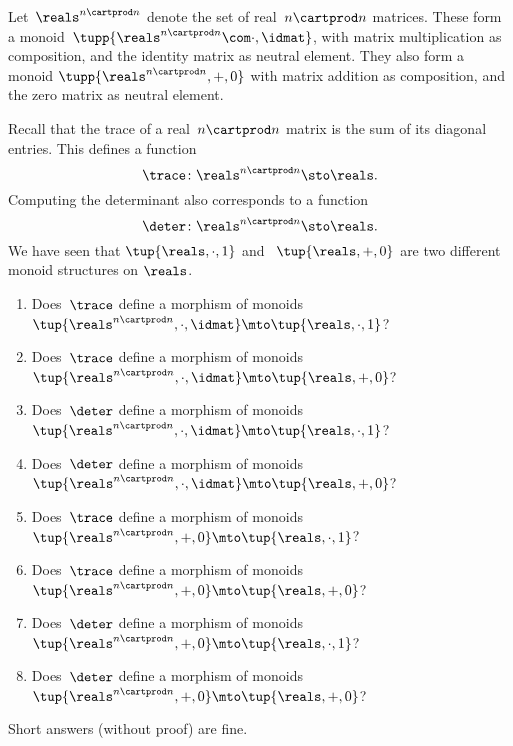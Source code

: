 \begin{gradedexercise}
	\label{ex:TraceAndDeterminant}
	Let~$\reals^{n \cartprod n}$ denote the set of real~$n \cartprod n$ matrices.
	These form a monoid~$\tupp{\reals^{n \cartprod n}\com \cdot, \idmat}$, with matrix multiplication as composition, and the identity matrix as neutral element.
	They also form a monoid $\tupp{\reals^{n \cartprod n}, + , 0}$ with matrix addition as composition, and the zero matrix as neutral element.

	Recall that the trace of a real~$n \cartprod n$ matrix is the sum of its diagonal entries.
	This defines a function
	\begin{equation}
		\trace \colon \reals^{n \cartprod n} \sto \reals.
	\end{equation}
	Computing the determinant also corresponds to a function
	\begin{equation}
		\deter \colon \reals^{n \cartprod n} \sto \reals.
	\end{equation}
	We have seen that $\tup{ \reals, \cdot, 1}$ and ~$\tup{ \reals, +, 0}$ are two different monoid structures on $\reals$.
	\begin{enumerate}
		\item Does~$\trace$ define a morphism of monoids~$\tup{\reals^{n \cartprod n}, \cdot, \idmat} \mto \tup{ \reals, \cdot, 1}$?
		\item Does~$\trace$ define a morphism of monoids~$\tup{\reals^{n \cartprod n}, \cdot, \idmat} \mto \tup{ \reals, + , 0}$?
		\item Does~$\deter$ define a morphism of monoids~$\tup{\reals^{n \cartprod n}, \cdot, \idmat} \mto \tup{ \reals, \cdot, 1}$?
		\item Does~$\deter$ define a morphism of monoids~$\tup{\reals^{n \cartprod n}, \cdot, \idmat} \mto \tup{ \reals, + , 0}$?
		\item Does~$\trace$ define a morphism of monoids~$\tup{\reals^{n \cartprod n}, +, 0} \mto \tup{ \reals, \cdot, 1}$?
		\item Does~$\trace$ define a morphism of monoids~$\tup{\reals^{n \cartprod n}, +, 0} \mto \tup{ \reals, + , 0}$?
		\item Does~$\deter$ define a morphism of monoids~$\tup{\reals^{n \cartprod n}, +, 0} \mto \tup{ \reals, \cdot, 1}$?
		\item Does~$\deter$ define a morphism of monoids~$\tup{\reals^{n \cartprod n}, +, 0} \mto \tup{ \reals, + , 0}$?
	\end{enumerate}
	Short answers (without proof) are fine.
\end{gradedexercise}

